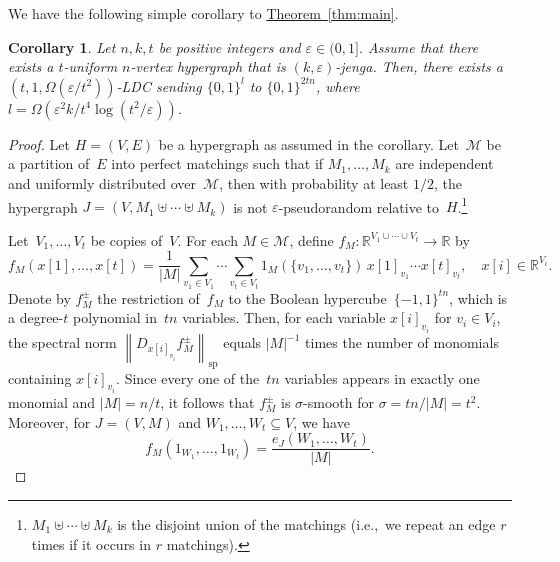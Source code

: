 \documentclass[11pt]{article}
\numberwithin{equation}{section}
\newtheorem{corollary}[theorem]{Corollary}
\theoremstyle{definition}
\theoremstyle{plain}
\newcommand{\R}{\mathbb R}
\newcommand{\expref}[2]{\hyperref[#2]{#1~\ref{#2}}}
\newcommand{\bset}[1]{\{0,1\}^{#1}} %
\newcommand{\pmset}[1]{\{-1,1\}^{#1}} %
\newcommand{\specnorm}[1]{\left\lVert #1 \right\rVert_{\mathrm{sp}}}
\newcommand{\eps}{\varepsilon}
\newcommand{\beqn}{\begin{equation*}}
\newcommand{\eeqn}{\end{equation*}}
\begin{document}
We have the following simple corollary to \expref{Theorem}{thm:main}.

\begin{corollary}\label{cor:jenga_ldc}
Let $n,k,t$ be positive integers and $\eps \in (0,1]$.
Assume that there exists a $t$-uniform $n$-vertex hypergraph that is $(k, \eps)$-jenga.
Then, there exists a $(t, 1, \Omega(\eps/t^2))$-LDC sending $\bset{l}$ to $\bset{2tn}$, where $l = \Omega(\eps^2k/t^4\log(t^2/\eps))$.
\end{corollary}

\begin{proof}
Let $H = (V,E)$ be a hypergraph as assumed in the corollary.
Let~$\mathcal M$ be a partition of~$E$ into perfect matchings such that if $M_1,\dots,M_k$ are independent and uniformly distributed over~$\mathcal M$, then with probability at least $1/2$, the hypergraph $J = (V, M_1\uplus\cdots\uplus M_k)$ is not $\eps$-pseudorandom relative to~$H$.\footnote{$M_1\uplus\cdots\uplus M_k$ is the disjoint union of the matchings (i.e.,\ we repeat an edge $r$ times if it occurs in $r$ matchings).}

Let~$V_1,\dots,V_t$ be copies of~$V$.
For each $M\in \mathcal M$, define $f_M:\R^{V_1\cup\cdots\cup V_t}\to\R$ by
\beqn
f_M(x[1],\dots,x[t]) = \frac{1}{|M|}
\sum_{v_1\in V_1}\cdots\sum_{v_t\in V_t}
1_M(\{v_1,\dots,v_t\})\,
x[1]_{v_1}\cdots x[t]_{v_t},
\quad
x[i] \in \R^{V_i}.
\eeqn
Denote by $f_M^\pm$ the restriction of~$f_M$ to the Boolean hypercube~$\pmset{tn}$, which is a degree-$t$ polynomial in~$tn$ variables.
Then, for each variable $x[i]_{v_i}$ for $v_i\in V_i$, the spectral norm $\specnorm{D_{x[i]_{v_i}}f_M^\pm}$ equals $|M|^{-1}$ times the number of monomials containing $x[i]_{v_i}$.
Since every one of the~$tn$ variables appears in exactly one monomial and $|M| = n/t$, it follows that $f_M^\pm$ is $\sigma$-smooth for $\sigma = tn/|M| = t^2$.
Moreover, for $J = (V, M)$ and $W_1,\dots,W_t\subseteq V$, we have
\beqn
f_{M}(1_{W_1},\dots, 1_{W_t})
=
\frac{e_J(W_1,\dots,W_t)}{|M|}.
\eeqn


\end{proof}
\end{document}
